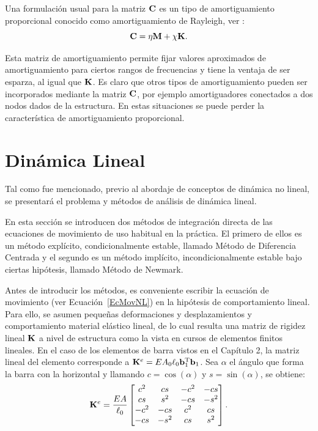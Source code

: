 Una formulación usual para la matriz ${\bf C}$ es un tipo de amortiguamiento proporcional conocido como amortiguamiento de Rayleigh, ver \citep{clough1993dynamics}:
%
\begin{equation}
	{\bf C} = \eta {\bf M} + \chi {\bf K}.
\end{equation}

Esta matriz de amortiguamiento permite fijar valores aproximados de amortiguamiento para ciertos rangos de frecuencias y tiene la ventaja de ser esparza, al igual que ${\bf K}$. %
%
Es claro que otros tipos de amortiguamiento pueden ser incorporados mediante la matriz ${\bf C}$, por ejemplo amortiguadores conectados a dos nodos dados de la estructura. %
%
En estas situaciones se puede perder la característica de amortiguamiento proporcional.


\section{Dinámica Lineal}\label{DinLin}

Tal como fue mencionado, previo al abordaje de conceptos de dinámica no lineal, se presentará el problema y métodos de análisis de dinámica lineal. %
%

En esta sección se introducen dos métodos de integración directa de las ecuaciones de movimiento de uso habitual en la práctica. %
%
El primero de ellos es un método explícito, condicionalmente estable, llamado Método de Diferencia Centrada y el segundo es un método implícito, incondicionalmente estable bajo ciertas hipótesis, llamado Método de Newmark.


Antes de introducir los métodos, es conveniente escribir la ecuación de movimiento (ver Ecuación~\eqref{EcMovNL}) en la hipótesis de comportamiento lineal. %
%
Para ello, se asumen pequeñas deformaciones y desplazamientos y comportamiento material elástico lineal, de lo cual resulta una matriz de rigidez lineal ${\bf K}$ a nivel de estructura como la vista en cursos de elementos finitos lineales. %
%
En el caso de los elementos de barra vistos en el Capítulo 2, la matriz lineal del elemento corresponde a ${\bf K}^e=E A_0 \ell_0 {\bf b}_1^\text{T} {\bf b}_1$. %
%
Sea $\alpha$ el ángulo que forma la barra con la horizontal y llamando $c=\cos(\alpha)$ y $s=\sin(\alpha)$, se obtiene:
%
\begin{equation}
{\bf K}^e = \frac{E A}{\ell_0}
\left[\begin{matrix}
c^2 & c s & -c^2 & -c s\\
c s & s^2 & -c s & -s^2\\
-c^2 & -c s & c^2 & c s\\
-c s & -s^2 & c s & s^2\\
\end{matrix}
\right].
\end{equation}


